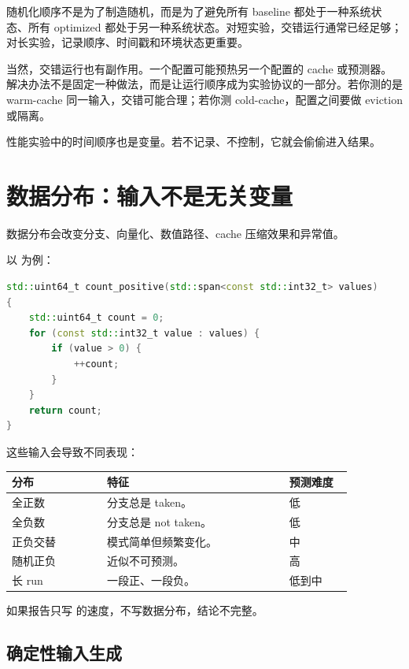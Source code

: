 随机化顺序不是为了制造随机，而是为了避免所有 baseline 都处于一种系统状态、所有 optimized 都处于另一种系统状态。对短实验，交错运行通常已经足够；对长实验，记录顺序、时间戳和环境状态更重要。

当然，交错运行也有副作用。一个配置可能预热另一个配置的 cache 或预测器。解决办法不是固定一种做法，而是让运行顺序成为实验协议的一部分。若你测的是 warm-cache 同一输入，交错可能合理；若你测 cold-cache，配置之间要做 eviction 或隔离。

\begin{mentalmodel}
性能实验中的时间顺序也是变量。若不记录、不控制，它就会偷偷进入结果。
\end{mentalmodel}

\section{数据分布：输入不是无关变量}

数据分布会改变分支、向量化、数值路径、cache 压缩效果和异常值。

以  为例：

\begin{lstlisting}[language=C++]
std::uint64_t count_positive(std::span<const std::int32_t> values)
{
    std::uint64_t count = 0;
    for (const std::int32_t value : values) {
        if (value > 0) {
            ++count;
        }
    }
    return count;
}
\end{lstlisting}

这些输入会导致不同表现：

\begin{center}
\begin{tabular}{p{0.24\linewidth}p{0.46\linewidth}p{0.16\linewidth}}
\toprule
分布 & 特征 & 预测难度 \\
\midrule
全正数 & 分支总是 taken。 & 低 \\
全负数 & 分支总是 not taken。 & 低 \\
正负交替 & 模式简单但频繁变化。 & 中 \\
随机正负 & 近似不可预测。 & 高 \\
长 run & 一段正、一段负。 & 低到中 \\
\bottomrule
\end{tabular}
\end{center}

如果报告只写  的速度，不写数据分布，结论不完整。

\subsection{确定性输入生成}

